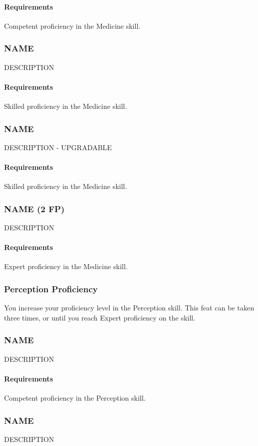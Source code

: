     \paragraph{Requirements} Competent proficiency in the Medicine skill.
\subsubsection{NAME} \label{feat::name}
    DESCRIPTION
    \paragraph{Requirements} Skilled proficiency in the Medicine skill.
\subsubsection{NAME} \label{feat::name}
    DESCRIPTION - UPGRADABLE
    \paragraph{Requirements} Skilled proficiency in the Medicine skill.
\subsubsection{NAME (2 FP)} \label{feat::name}
    DESCRIPTION
    \paragraph{Requirements} Expert proficiency in the Medicine skill.
\subsubsection{Perception Proficiency} \label{feat::perceptionprof}
    You increase your proficiency level in the Perception skill.
    This feat can be taken three times, or until you reach Expert proficiency on the skill.
\subsubsection{NAME} \label{feat::name}
    DESCRIPTION
    \paragraph{Requirements} Competent proficiency in the Perception skill.
\subsubsection{NAME} \label{feat::name}
    DESCRIPTION
